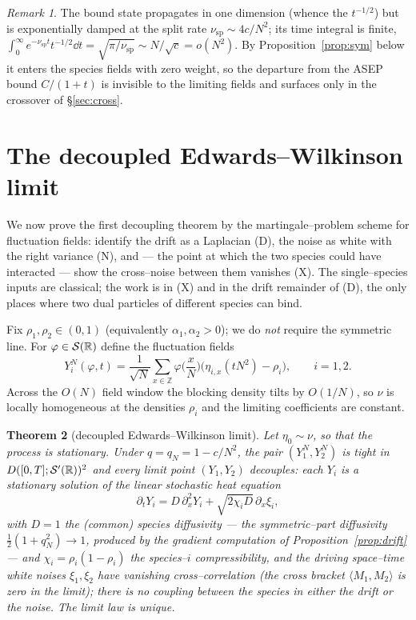 \documentclass[11pt]{article}
\theoremstyle{plain}
\newtheorem{theorem}{Theorem}[section]
\theoremstyle{definition}
\theoremstyle{remark}
\newtheorem{remark}[theorem]{Remark}
\newcommand{\Z}{\mathbb{Z}}\newcommand{\R}{\mathbb{R}}\newcommand{\N}{\mathbb{N}}
\begin{document}
\begin{remark}\label{rem:boundstate}
The bound state propagates in one dimension (whence the $t^{-1/2}$) but is
exponentially damped at the split rate $\nu_{\mathrm{sp}}\sim4c/N^2$; its time integral
is finite, $\int_0^\infty e^{-\nu_{\mathrm{sp}}t}t^{-1/2}\dd t=\sqrt{\pi/\nu_{\mathrm{sp}}}
\sim N/\sqrt c=o(N^2)$. By Proposition~\ref{prop:sym} below it enters the species fields
with zero weight, so the departure from the ASEP bound $C/(1+t)$ is invisible to the
limiting fields and surfaces only in the crossover of \S\ref{sec:cross}.
\end{remark}

\section{The decoupled Edwards--Wilkinson limit}\label{sec:ew}

We now prove the first decoupling theorem by the martingale--problem scheme for
fluctuation fields: identify the drift as a Laplacian (D), the noise as white with the
right variance (N), and --- the point at which the two species could have interacted ---
show the cross--noise between them vanishes (X). The single--species inputs are
classical; the work is in (X) and in the drift remainder of (D), the only places where
two dual particles of different species can bind.

Fix $\rho_1,\rho_2\in(0,1)$ (equivalently $\alpha_1,\alpha_2>0$); we do \emph{not}
require the symmetric line. For $\varphi\in\cS(\R)$ define the fluctuation fields
\begin{equation}\label{eq:field}
  Y_i^N(\varphi,t)=\frac1{\sqrt N}\sum_{x\in\Z}\varphi\Big(\frac xN\Big)
   \big(\eta_{i,x}(tN^2)-\rho_i\big),\qquad i=1,2.
\end{equation}
Across the $O(N)$ field window the blocking density tilts by $O(1/N)$, so $\nu$ is
locally homogeneous at the densities $\rho_i$ and the limiting coefficients are constant.

\begin{theorem}[decoupled Edwards--Wilkinson limit]\label{thm:ewmain}
Let $\eta_0\sim\nu$, so that the process is stationary. Under $q=q_N=1-c/N^2$, the
pair $(Y_1^N,Y_2^N)$ is tight in
$D([0,T];\cS'(\R))^2$ and every limit point $(Y_1,Y_2)$ \emph{decouples}: each $Y_i$ is
a stationary solution of the linear stochastic heat equation
\[
  \partial_t Y_i=D\,\partial_x^2 Y_i+\sqrt{2\chi_i D}\,\partial_x\xi_i,
\]
with $D=1$ the (common) species diffusivity --- the symmetric--part diffusivity
$\tfrac12(1+q_N^2)\to1$, produced by the gradient computation of
Proposition~\ref{prop:drift} --- and $\chi_i=\rho_i(1-\rho_i)$ the
species--$i$ compressibility,
and the driving space--time white noises $\xi_1,\xi_2$ have \emph{vanishing
cross--correlation} (the cross bracket $\langle M_1,M_2\rangle$ is zero in the limit);
there is no coupling between the species in either the drift or the noise. The limit
law is unique.
\end{theorem}
\end{document}
